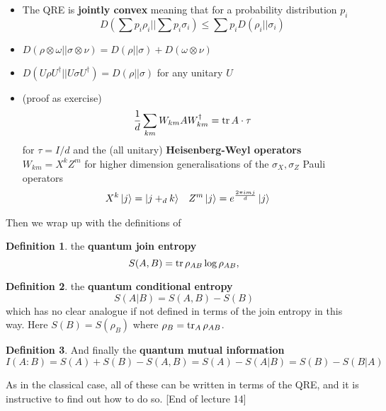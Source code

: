 \documentclass{article}
\newtheorem{lemma}{Lemma}
\theoremstyle{definition}
\newtheorem{definition}{Definition}
\begin{document}
\begin{itemize}
\begin{lemma}
\begin{equation}
        D(\Lambda(\rho) || \Lambda(\sigma)) \leq D(\rho || \sigma)
      \end{equation}
    \end{lemma}
  \item The QRE is \textbf{jointly convex} meaning that for a probability 
    distribution $p_i$
    \begin{equation}
      D(\sum p_i \rho_i || \sum p_i \sigma_i) \leq \sum p_i D(\rho_i ||
      \sigma_i)
    \end{equation}
  \item $D(\rho \otimes \omega || \sigma \otimes \nu) = D(\rho || \sigma) +
    D(\omega \otimes \nu)$
  \item $D(U\rho U^\dagger || U\sigma U^\dagger) = D(\rho || \sigma)$ for any
    unitary $U$
  \item (proof as exercise) 
    \begin{equation}
      \frac{1}{d} \sum_{km} W_{km} A W_{km}^\dagger = \tr A\cdot \tau
    \end{equation}
    for $\tau = I / d$ and the (all unitary) \textbf{Heisenberg-Weyl operators}
    $W_{km} = X^k Z^m$ for higher dimension generalisations of the $\sigma_X,
    \sigma_Z$ Pauli operators
    \begin{align}
      X^k \ket{j} &= \ket{j +_d k}  & Z^m\ket{j} &= e^{\frac{2\pi i mj}{d}}
      \ket{j}
    \end{align}
\end{itemize}

Then we wrap up with the definitions of
\begin{definition}
  the \textbf{quantum join entropy}
  \begin{equation}
    S(A, B) = \tr \rho_{AB} \log \rho_{AB},
  \end{equation}
\end{definition}
\begin{definition}
  the \textbf{quantum conditional entropy}
  \begin{equation}
    S(A | B) = S(A, B) - S(B)
  \end{equation}
  which has no clear analogue if not defined in terms of the join entropy in 
  this way. Here $S(B) = S(\rho_B)$ where $\rho_B = \tr_A \rho_{AB}$.
\end{definition}
\begin{definition}
  And finally the \textbf{quantum mutual information}
  \begin{equation}
    I(A : B) = S(A) + S(B) - S(A, B) = S(A) - S(A | B) = S(B) - S(B | A)
  \end{equation}
\end{definition}

As in the classical case, all of these can be written in terms of the QRE, and 
it is instructive to find out how to do so. [End of lecture 14]
\end{document}
